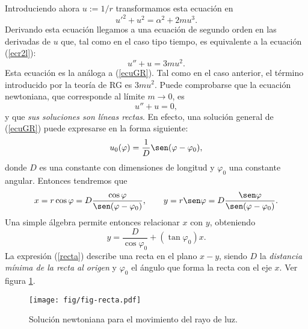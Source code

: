 Introduciendo ahora $u:=1/r$ transformamos esta ecuación en
\begin{equation}
 u'^2+u^2=\alpha^2+2mu^3. \label{ecul0}
\end{equation}
Derivando esta ecuación llegamos a una ecuación de segundo orden en las derivadas de $u$ que, tal como en el caso tipo tiempo, es equivalente a la ecuación (\ref{ecr2l}):
\begin{equation}
 u''+u=3mu^2. \label{ecglrg}
\end{equation}
Esta ecuación es la análoga a (\ref{ecuGR}). Tal como en el caso anterior, el término introducido por la teoría de RG es $3mu^2$. Puede comprobarse que la ecuación newtoniana, que corresponde al límite $m\to 0$, es
\begin{equation}
 u''+u=0, \label{ecglnew}
\end{equation}
y que \textit{sus soluciones son líneas rectas}. En efecto, una solución general de (\ref{ecuGR}) puede expresarse en la forma siguiente:
\begin{equation}
 u_0(\varphi)=\frac{1}{D}\sen(\varphi-\varphi_0),
\end{equation}
donde $D$ es una constante con dimensiones de longitud y $\varphi_0$ una constante angular. Entonces tendremos que
\begin{equation}
x=r\cos\varphi=D\frac{\cos\varphi}{\sen(\varphi-\varphi_0)}, \qquad
y=r\sen\varphi=D\frac{\sen\varphi}{\sen(\varphi-\varphi_0)}.
\end{equation}
Una simple álgebra permite entonces relacionar $x$ con $y$, obteniendo
\begin{equation}
 y=\frac{D}{\cos\varphi_0}+\left(\tan\varphi_0\right)x. \label{recta}
\end{equation}
La expresión (\ref{recta}) describe una recta en el plano $x-y$, siendo $D$ la \textit{distancia mínima de la recta al origen} y $\varphi_0$ el ángulo que forma la recta con el eje $x$. Ver figura \ref{fig:recta}.
\begin{figure}[H]
 \begin{center}
\texttt{[image: fig/fig-recta.pdf]}
\caption{Solución newtoniana para el movimiento del rayo de luz.}
\label{fig:recta}
\end{center}
\end{figure}

